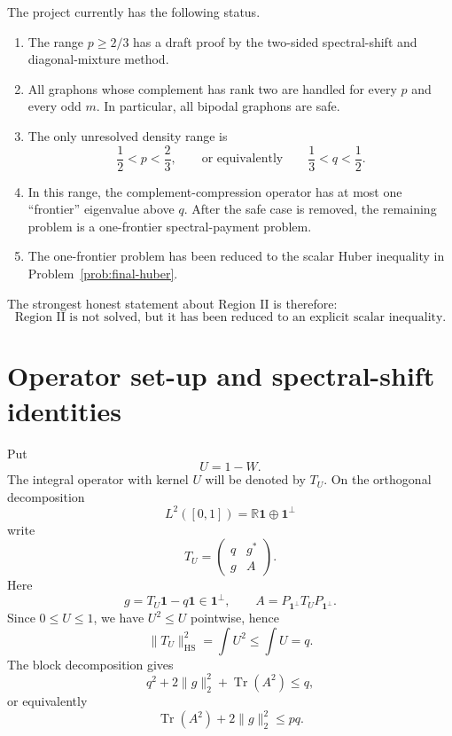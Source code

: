 \documentclass[11pt]{article}
\newcommand{\one}{\mathbf 1}
\newcommand{\Tr}{\operatorname{Tr}}
\begin{document}
The project currently has the following status.
\begin{enumerate}[label=(\roman*)]
\item The range $p\ge2/3$ has a draft proof by the two-sided
spectral-shift and diagonal-mixture method.
\item All graphons whose complement has rank two are handled for every
$p$ and every odd $m$.  In particular, all bipodal graphons are safe.
\item The only unresolved density range is
\[
        \frac12<p<\frac23,
        \qquad\text{or equivalently}\qquad
        \frac13<q<\frac12.
\]
\item In this range, the complement-compression operator has at most one
``frontier'' eigenvalue above $q$.  After the safe case is removed, the
remaining problem is a one-frontier spectral-payment problem.
\item The one-frontier problem has been reduced to the scalar Huber
inequality in Problem~\ref{prob:final-huber}.
\end{enumerate}

The strongest honest statement about Region II is therefore:
\[
\boxed{\text{Region II is not solved, but it has been reduced to an explicit scalar inequality.}}
\]

\section{Operator set-up and spectral-shift identities}

Put
\[
        U=1-W.
\]
The integral operator with kernel $U$ will be denoted by $T_U$.  On the
orthogonal decomposition
\[
        L^2([0,1])=\mathbb R\one\oplus\one^\perp
\]
write
\begin{equation}\label{eq:blockTU}
        T_U=
        \begin{pmatrix}
        q&g^*\\
        g&A
        \end{pmatrix}.
\end{equation}
Here
\[
        g=T_U\one-q\one\in\one^\perp,
        \qquad
        A=P_{\one^\perp}T_U P_{\one^\perp}.
\]
Since $0\le U\le1$, we have $U^2\le U$ pointwise, hence
\[
        \|T_U\|_{\mathrm{HS}}^2=\int U^2\le \int U=q.
\]
The block decomposition gives
\begin{equation}\label{eq:budget}
        q^2+2\|g\|_2^2+\Tr(A^2)\le q,
\end{equation}
or equivalently
\begin{equation}\label{eq:HS-budget}
        \Tr(A^2)+2\|g\|_2^2\le pq.
\end{equation}
\end{document}
